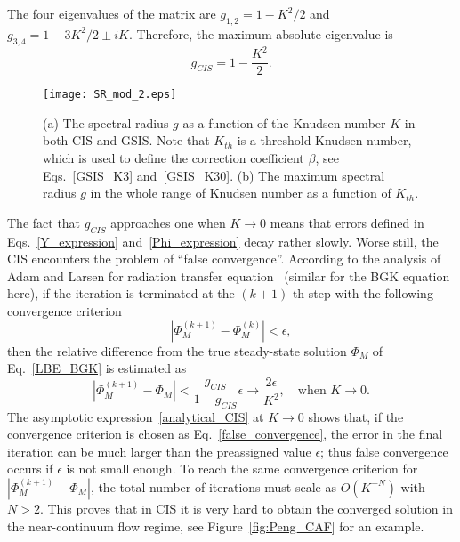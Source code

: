 The four eigenvalues of the matrix are ${g}_{1,2}=1-K^2/2$ and ${g}_{3,4}=1-3K^2/2\pm{}iK$. Therefore, the maximum absolute eigenvalue is 
\begin{equation}\label{analytical_CIS}
{g}_{CIS}=1-\frac{K^2}{2}.
\end{equation}



\begin{figure}[t]
	\centering
	\texttt{[image: SR\_mod\_2.eps]}
	\caption{ (a) The spectral radius ${g}$ as a function of the Knudsen number $K$ in both CIS and GSIS. Note that $K_{th}$ is a threshold Knudsen number, which is used to define the correction coefficient $\beta$, see Eqs.~\eqref{GSIS_K3} and~\eqref{GSIS_K30}. (b) The maximum spectral radius ${g}$ in the whole range of Knudsen number as a function of $K_{th}$.  }
	\label{fig:SR}
\end{figure}


The fact that ${g}_{CIS}$ approaches one when $K\rightarrow0$ means that errors defined in Eqs.~\eqref{Y_expression} and~\eqref{Phi_expression} decay rather slowly. Worse still, the CIS encounters the problem of ``false convergence''. According to the analysis of Adam and Larsen for radiation transfer equation~\cite{DSA2002} (similar for the BGK equation here), if the iteration is terminated at the $(k+1)$-th step with the following convergence criterion
\begin{equation}\label{false_convergence}
|\Phi_M^{(k+1)}-\Phi_M^{(k)}|<\epsilon,
\end{equation}
then the relative difference from the true steady-state solution $\Phi_M$ of Eq.~\eqref{LBE_BGK} is estimated as
\begin{equation}\label{false_convergence2}
|\Phi_M^{(k+1)}-\Phi_M|<\frac{{g}_{CIS}}{1-{g}_{CIS}}\epsilon\rightarrow\frac{2\epsilon}{K^2}, \quad \text{when~}K\rightarrow0.
\end{equation}
The asymptotic expression~\eqref{analytical_CIS} at $K\rightarrow0$ shows that, if the convergence criterion is chosen as Eq.~\eqref{false_convergence}, the error in the final iteration can be much larger than the preassigned value $\epsilon$; thus false convergence occurs if $\epsilon$ is not small enough. To reach the same convergence criterion for $|\Phi_M^{(k+1)}-\Phi_M|$, the total number of iterations must scale as $O(K^{-N})$ with $N>2$. This proves that in CIS it is very hard to obtain the converged solution in the near-continuum flow regime, see Figure~\ref{fig:Peng_CAF} for an example.




